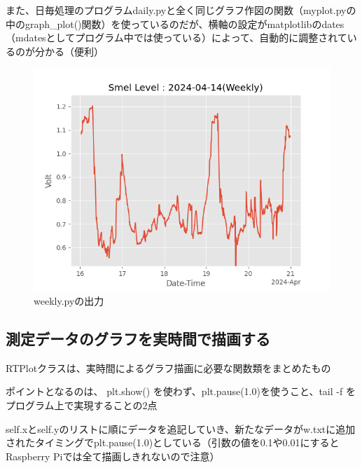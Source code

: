 \documentclass[12pt,a4j]{jsbook}
\begin{document}
また、日毎処理のプログラムdaily.pyと全く同じグラフ作図の関数（myplot.pyの中のgraph\_plot()関数）を使っているのだが、横軸の設定がmatplotlibのdates（mdatesとしてプログラム中では使っている）によって、自動的に調整されているのが分かる（便利）

\begin{figure}[htbp]
	\begin{minipage}[b]{1.0\linewidth}
		\centering
		\includegraphics[keepaspectratio, scale=0.8]{figs/png/Weekly_2024-04-14.png}
		\caption{weekly.pyの出力}
	\end{minipage}
\end{figure}

\newpage

\subsection{測定データのグラフを実時間で描画する}

	RTPlotクラスは、実時間によるグラフ描画に必要な関数類をまとめたもの

	ポイントとなるのは、 plt.show() を使わず、plt.pause(1.0)を使うこと、tail -f をプログラム上で実現することの2点

	self.xとself.yのリストに順にデータを追記していき、新たなデータがw.txtに追加されたタイミングでplt.pause(1.0)としている（引数の値を0.1や0.01にするとRaspberry Piでは全て描画しきれないので注意）
\end{document}
